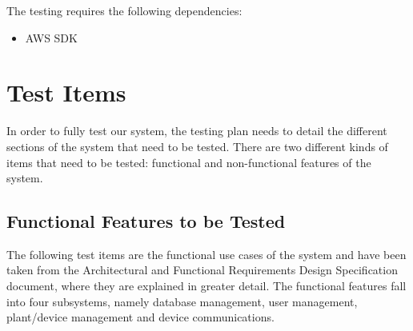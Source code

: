 \documentclass{article}
\begin{document}
		The testing requires the following dependencies:
		\begin{itemize}
			\item AWS SDK
		\end{itemize}

\newpage

\section{Test Items}
	In order to fully test our system, the testing plan needs to detail the different sections of the system that need to be tested. There are two different kinds of items that need to be tested: functional and non-functional features of the system.
	
	\subsection{Functional Features to be Tested}
		The following test items are the functional use cases of the system and have been taken from the Architectural and Functional Requirements Design Specification document, where they are explained in greater detail. The functional features fall into four subsystems, namely database management, user management, plant/device management and device communications.
		
\end{document}
